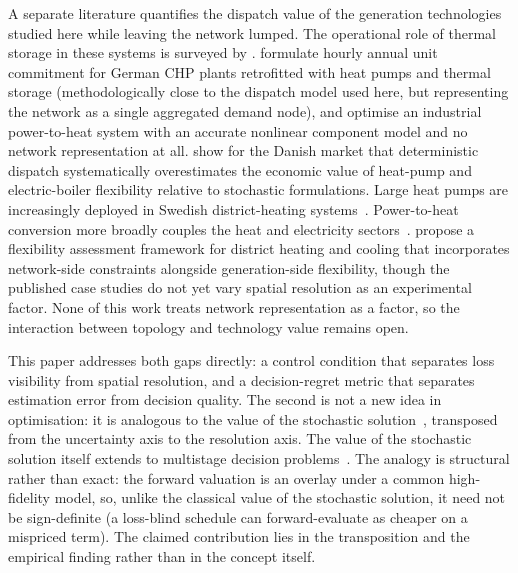 \documentclass[a4paper,fleqn]{cas-sc}
\providecommand{\citet}[1]{\cite{#1}}
\providecommand{\citep}[1]{\cite{#1}}
\begin{document}
A separate literature quantifies the dispatch value of the generation technologies
studied here while leaving the network lumped. The operational role of thermal storage in
these systems is surveyed by \citet{Guelpa2019review}. \citet{Mollenhauer2018} formulate hourly
annual unit commitment for German CHP plants retrofitted with heat pumps and thermal
storage (methodologically close to the dispatch model used here, but representing the
network as a single aggregated demand node), and \citet{Walden2023} optimise an
industrial power-to-heat system with an accurate nonlinear component model and no network
representation at all. \citet{Nielsen2016} show for the Danish market that deterministic
dispatch systematically overestimates the economic value of heat-pump and electric-boiler
flexibility relative to stochastic formulations. Large heat pumps are increasingly deployed
in Swedish district-heating systems~\citep{Averfalk2017}. Power-to-heat conversion more
broadly couples the heat and electricity sectors~\citep{Schweiger2017_p2h}. \citet{Riedl2026} propose a flexibility
assessment framework for district heating and cooling that incorporates network-side
constraints alongside generation-side flexibility, though the published case studies do
not yet vary spatial resolution as an experimental factor. None of this work treats
network representation as a factor, so the interaction between topology and technology
value remains open.

This paper addresses both gaps directly: a control condition that separates loss
visibility from spatial resolution, and a decision-regret metric that separates
estimation error from decision quality. The second is not a new idea in optimisation:
it is analogous to the value of the stochastic solution~\citep{BirgeLouveaux2011}, transposed
from the uncertainty axis to the resolution axis. The value of the stochastic solution itself
extends to multistage decision problems~\citep{Escudero2007VSS}. The analogy is structural rather than exact:
the forward valuation is an overlay under a common high-fidelity model, so, unlike the classical
value of the stochastic solution, it need not be sign-definite (a loss-blind schedule can
forward-evaluate as cheaper on a mispriced term). The claimed contribution lies in the
transposition and the empirical finding rather than in the concept itself.
\end{document}
